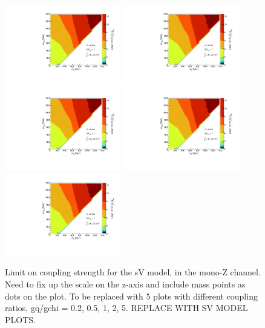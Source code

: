\begin{figure}[!h]
\begin{center}
\includegraphics[width=0.45\textwidth]{figures/coupling_limits_TSD_1.pdf}
\includegraphics[width=0.45\textwidth]{figures/coupling_limits_TSD_1.pdf}
\includegraphics[width=0.45\textwidth]{figures/coupling_limits_TSD_1.pdf}
\includegraphics[width=0.45\textwidth]{figures/coupling_limits_TSD_1.pdf}
\includegraphics[width=0.45\textwidth]{figures/coupling_limits_TSD_1.pdf}
\caption{Limit on coupling strength for the sV model, in the mono-Z channel.  Need to fix up the scale on the z-axis and include mass points as dots on the plot. To be replaced with 5 plots with different coupling ratios, gq/gchi = 0.2, 0.5, 1, 2, 5. REPLACE WITH SV MODEL PLOTS.}
\label{fig:MonoZ_SVD_couplinglimit}
\end{center}
\end{figure}

